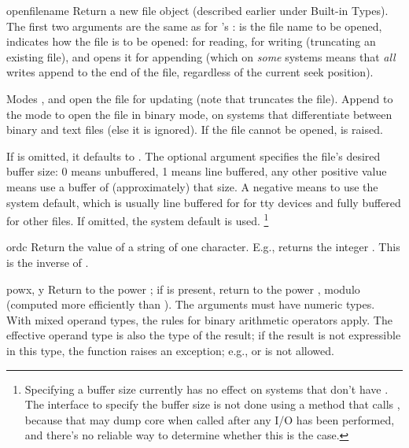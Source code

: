 \begin{funcdesc}{open}{filename}
  Return a new file object (described earlier under Built-in Types).
  The first two arguments are the same as for 's
  :  is the file name to be opened,
   indicates how the file is to be opened:  for
  reading,  for writing (truncating an existing file), and
   opens it for appending (which on \emph{some} \UNIX{}
  systems means that \emph{all} writes append to the end of the file,
  regardless of the current seek position).

  Modes ,  and  open the file for
  updating (note that  truncates the file).  Append
   to the mode to open the file in binary mode, on systems
  that differentiate between binary and text files (else it is
  ignored).  If the file cannot be opened,  is
  raised.

If  is omitted, it defaults to .
The optional  argument specifies the file's desired
buffer size: 0 means unbuffered, 1 means line buffered, any other
positive value means use a buffer of (approximately) that size.  A
negative  means to use the system default, which is
usually line buffered for for tty devices and fully buffered for other
files.  If omitted, the system default is used.%
\footnote{Specifying a buffer size currently has no effect on systems
that don't have .  The interface to specify the buffer
size is not done using a method that calls , because
that may dump core when called after any I/O has been performed, and
there's no reliable way to determine whether this is the case.}
\end{funcdesc}

\begin{funcdesc}{ord}{c}
  Return the \ASCII{} value of a string of one character.  E.g.,
   returns the integer .  This is the inverse of
  .
\end{funcdesc}

\begin{funcdesc}{pow}{x, y}
  Return  to the power ; if  is present, return
   to the power , modulo  (computed more
  efficiently than ).
  The arguments must have
  numeric types.  With mixed operand types, the rules for binary
  arithmetic operators apply.  The effective operand type is also the
  type of the result; if the result is not expressible in this type, the
  function raises an exception; e.g.,  or  is not allowed.
\end{funcdesc}

